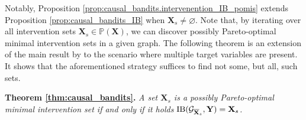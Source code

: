 Notably, Proposition \ref{prop:causal_bandits.intervenention_IB_pomis} extends Proposition \ref{prop:causal_bandits_IB} when $\mathbf{X}_s \neq \varnothing$. Note that, by iterating over all intervention sets $\mathbf{X}_s \in \mathbb{P}(\mathbf{X})$, we can discover possibly Pareto-optimal minimal intervention sets in a given graph. The following theorem is an extension of the main result by \citet{NEURIPS2018_c0a271bc} to the scenario where multiple target variables are present. It shows that the aforementioned strategy suffices to find not some, but all, such sets.

\textbf{Theorem \ref{thm:causal_bandits}.}
    \textit{A set $\mathbf{X}_s$ is a possibly Pareto-optimal minimal intervention set if and only if it holds $\textnormal{IB}(\mathcal{G}_{\overline{\mathbf{X}}_s}, \mathbf{Y}) = \mathbf{X}_s$.}

